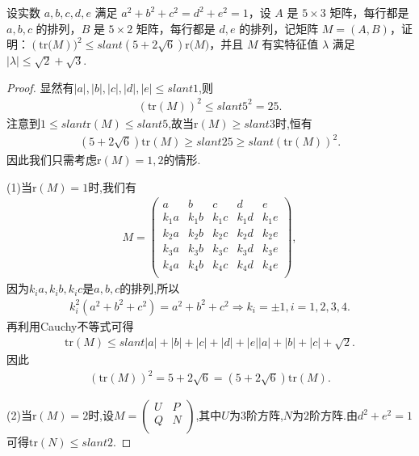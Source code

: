 \documentclass[../../main.tex]{subfiles}
\begin{document}
\begin{example}
设实数 $a,b,c,d,e$ 满足 $a^2 + b^2 + c^2 = d^2 + e^2 = 1$，设 $A$ 是 $5 \times 3$ 矩阵，每行都是 $a,b,c$ 的排列，$B$ 是 $5 \times 2$ 矩阵，每行都是 $d,e$ 的排列，记矩阵 $M = (A,B)$，证明：$(\mathrm{tr(}M))^2\leqslant slant \left( 5+2\sqrt{6} \right) \mathrm{r(}M)$，并且 $M$ 有实特征值 $\lambda$ 满足 $|\lambda| \leqslant  \sqrt{2} + \sqrt{3}$.
\end{example}
\begin{proof}
显然有$|a|,|b|,|c|,|d|,|e|\leqslant slant 1$,则
\begin{align*}
(\mathrm{tr}(M))^2\leqslant slant 5^2=25.
\end{align*}
注意到$1\leqslant slant \mathrm{r}(M) \leqslant slant 5$,故当$\mathrm{r}(M) \geqslant slant 3$时,恒有
\begin{align*}
\left( 5+2\sqrt{6} \right) \mathrm{tr}(M)\geqslant slant 25\geqslant slant (\mathrm{tr}(M))^2.
\end{align*}
因此我们只需考虑$\mathrm{r}(M) =1,2$的情形.

(1)当$\mathrm{r}(M) =1$时,我们有
\begin{align*}
M=\begin{pmatrix}
a&		b&		c&		d&		e\\
k_1a&		k_1b&		k_1c&		k_1d&		k_1e\\
k_2a&		k_2b&		k_2c&		k_2d&		k_2e\\
k_3a&		k_3b&		k_3c&		k_3d&		k_3e\\
k_4a&		k_4b&		k_4c&		k_4d&		k_4e\\
\end{pmatrix},
\end{align*}
因为$k_ia,k_ib,k_ic$是$a,b,c$的排列,所以
\begin{align*}
k_{i}^{2}\left( a^2+b^2+c^2 \right) =a^2+b^2+c^2\Rightarrow k_i=\pm 1,i=1,2,3,4.
\end{align*}
再利用Cauchy不等式可得
\begin{align*}
\mathrm{tr}\left( M \right) \leqslant slant |a|+|b|+|c|+|d|+|e| |a|+|b|+|c|+\sqrt{2}.
\end{align*}
因此
\begin{align*}
\left( \mathrm{tr}\left( M \right) \right) ^2=5+2\sqrt{6}=\left( 5+2\sqrt{6} \right) \mathrm{tr}(M).
\end{align*}

(2)当$\mathrm{r}(M) =2$时,设$M=\begin{pmatrix}
U&		P\\
Q&		N\\
\end{pmatrix}$,其中$U$为$3$阶方阵,$N$为$2$阶方阵.由$d^2+e^2=1$可得$\mathrm{tr}(N) \leqslant slant 2$.


\end{proof}
\end{document}
